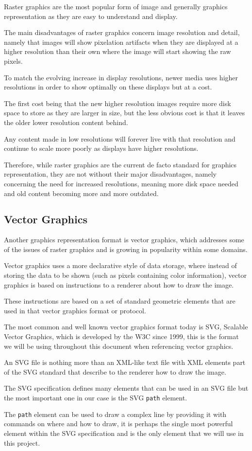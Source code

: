 \documentclass[12pt]{article}
\newcommand{\sentence}{} %
\newcommand{\code}[1]{\texttt{#1}}
\begin{document}
    \bigskip
    Raster graphics are the most popular form of image and generally graphics representation as they are easy to
    understand and display.
    \sentence
    The main disadvantages of raster graphics concern image resolution and detail, namely that images will show
    pixelation artifacts when they are displayed at a higher resolution than their own where the image will start
    showing the raw pixels.
    \sentence
    To match the evolving increase in display resolutions, newer media uses higher resolutions in order to show
    optimally on these displays but at a cost.
    \sentence
    The first cost being that the new higher resolution images require more disk space to store as they are larger in
    size, but the less obvious cost is that it leaves the older lower resolution content behind.
    \sentence
    Any content made in low resolutions will forever live with that resolution and continue to scale more poorly as
    displays have higher resolutions.
    \sentence
    Therefore, while raster graphics are the current de facto standard for graphics representation, they are not
    without their major disadvantages, namely concerning the need for increased resolutions, meaning more disk space
    needed and old content becoming more and more outdated.


    \subsection{Vector Graphics}\label{subsec:vector-graphics}

    \tab
    Another graphics representation format is vector graphics, which addresses some of the issues of raster graphics
    and is growing in popularity within some domains.
    \sentence
    Vector graphics uses a more declarative style of data storage, where instead of storing the data to be shown
    (such as pixels containing color information), vector graphics is based on instructions to a renderer
    about how to draw the image.
    \sentence
    These instructions are based on a set of standard geometric elements that are used in that vector graphics format
    or protocol.
    \sentence
    The most common and well known vector graphics format today is SVG, Scalable Vector Graphics, which is developed
    by the W3C since 1999, this is the format we will be using throughout this document when referencing vector
    graphics.
    \sentence
    An SVG file is nothing more than an XML-like text file with XML elements part of the SVG standard that describe
    to the renderer how to draw the image.
    \sentence
    The SVG specification defines many elements that can be used in an SVG file but the most important one in our
    case is the SVG \code{path} element.
    \sentence
    The \code{path} element can be used to draw a complex line by providing it with commands on where and how to
    draw, it is perhaps the single most powerful element within the SVG specification and is the only element that we
    will use in this project.
    \sentence
\end{document}

